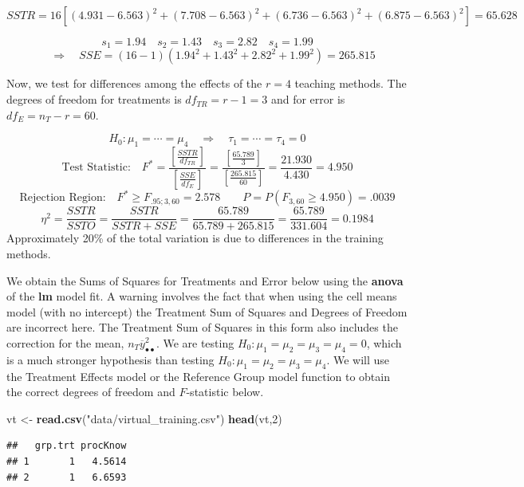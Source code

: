 \documentclass[
]{book}
\newenvironment{Shaded}{\begin{snugshade}}{\end{snugshade}}
\newcommand{\DecValTok}[1]{\textcolor[rgb]{0.00,0.00,0.81}{#1}}
\newcommand{\FunctionTok}[1]{\textcolor[rgb]{0.13,0.29,0.53}{\textbf{#1}}}
\newcommand{\NormalTok}[1]{#1}
\newcommand{\OtherTok}[1]{\textcolor[rgb]{0.56,0.35,0.01}{#1}}
\newcommand{\StringTok}[1]{\textcolor[rgb]{0.31,0.60,0.02}{#1}}
\begin{document}
\[
SSTR=16\left[(4.931-6.563)^2+(7.708-6.563)^2+(6.736-6.563)^2+(6.875-6.563)^2\right]
=65.628
\]

\[
s_1=1.94 \quad s_2=1.43 \quad s_3=2.82 \quad s_4=1.99
\] \[
\quad \Rightarrow \quad SSE=(16-1)\left(1.94^2+1.43^2+2.82^2+1.99^2\right)=265.815
\]

Now, we test for differences among the effects of the \(r=4\) teaching
methods. The degrees of freedom for treatments is \(df_{TR}=r-1=3\) and
for error is \(df_E=n_T-r=60\).

\[
H_0: \mu_1=\cdots = \mu_4 \quad \Rightarrow \quad \tau_1=\cdots = \tau_4 = 0
\] \[
\mbox{Test Statistic:} \quad F^* = 
\frac{\left[\frac{SSTR}{df_{TR}}\right]}
{\left[\frac{SSE}{df_{E}}\right]}
=\frac{\left[\frac{65.789}{3}\right]}
{\left[\frac{265.815}{60}\right]}
= \frac{21.930}{4.430} = 4.950
\] \[
\mbox{Rejection Region:} \quad F^* \geq F_{.95;3,60}=2.578  \qquad
P=P\left(F_{3,60} \geq 4.950\right) = .0039
\] \[
\eta^2=\frac{SSTR}{SSTO}=\frac{SSTR}{SSTR+SSE}=\frac{65.789}{65.789+265.815}=
\frac{65.789}{331.604}=0.1984
\] Approximately 20\% of the total variation is due to differences in
the training methods.

We obtain the Sums of Squares for Treatments and Error below using the
\textbf{anova} of the \textbf{lm} model fit. A warning involves the fact
that when using the cell means model (with no intercept) the Treatment
Sum of Squares and Degrees of Freedom are incorrect here. The Treatment
Sum of Squares in this form also includes the correction for the mean,
\(n_T\overline{y}_{\bullet\bullet}^2\). We are testing
\(H_0:\mu_1=\mu_2=\mu_3=\mu_4=0\), which is a much stronger hypothesis
than testing \(H_0:\mu_1=\mu_2=\mu_3=\mu_4\). We will use the Treatment
Effects model or the Reference Group model function to obtain the
correct degrees of freedom and \(F\)-statistic below.

\begin{Shaded}
\begin{Highlighting}[]
\NormalTok{vt }\OtherTok{\textless{}{-}} \FunctionTok{read.csv}\NormalTok{(}\StringTok{"data/virtual\_training.csv"}\NormalTok{)}
\FunctionTok{head}\NormalTok{(vt,}\DecValTok{2}\NormalTok{)}
\end{Highlighting}
\end{Shaded}

\begin{verbatim}
##   grp.trt procKnow
## 1       1   4.5614
## 2       1   6.6593
\end{verbatim}
\end{document}
